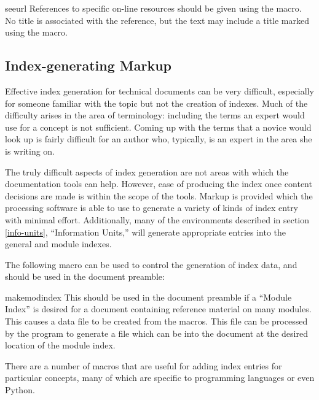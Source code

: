 \documentclass{howto}
\begin{document}
    \begin{macrodesc}{seeurl}{}
      References to specific on-line resources should be given using
      the  macro.  No title is associated with the
      reference, but the  text may include a title marked
      using the  macro.
    \end{macrodesc}


  \subsection{Index-generating Markup \label{indexing}}

    Effective index generation for technical documents can be very
    difficult, especially for someone familiar with the topic but not
    the creation of indexes.  Much of the difficulty arises in the
    area of terminology: including the terms an expert would use for a
    concept is not sufficient.  Coming up with the terms that a novice
    would look up is fairly difficult for an author who, typically, is
    an expert in the area she is writing on.

    The truly difficult aspects of index generation are not areas with
    which the documentation tools can help.  However, ease
    of producing the index once content decisions are made is within
    the scope of the tools.  Markup is provided which the processing
    software is able to use to generate a variety of kinds of index
    entry with minimal effort.  Additionally, many of the environments
    described in section \ref{info-units}, ``Information Units,'' will
    generate appropriate entries into the general and module indexes.

    The following macro can be used to control the generation of index
    data, and should be used in the document preamble:

    \begin{macrodesc}{makemodindex}{}
      This should be used in the document preamble if a ``Module
      Index'' is desired for a document containing reference material
      on many modules.  This causes a data file
       to be created from the
       macros.  This file can be processed by the
       program to generate a file which can be
       into the document at the desired location of the
      module index.
    \end{macrodesc}

    There are a number of macros that are useful for adding index
    entries for particular concepts, many of which are specific to
    programming languages or even Python.
\end{document}
